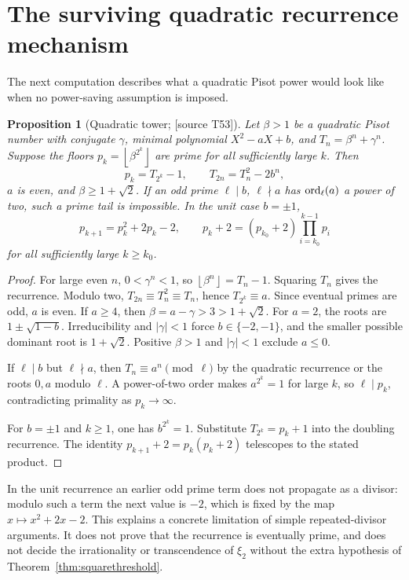 \documentclass[11pt,a4paper]{article}
\newtheorem{proposition}[theorem]{Proposition}
\theoremstyle{definition}\newtheorem{definition}[theorem]{Definition}
\theoremstyle{remark}\newtheorem{remark}[theorem]{Remark}
\newcommand{\floor}[1]{\left\lfloor #1\right\rfloor}\newcommand{\ceil}[1]{\left\lceil #1\right\rceil}
\newcommand{\sourceT}[1]{\textup{[source T#1]}}
\begin{document}
\section{The surviving quadratic recurrence mechanism}
The next computation describes what a quadratic Pisot power would look like when no power-saving assumption is imposed.
\begin{proposition}[Quadratic tower; \sourceT{53}]\label{prop:quadratic}
Let $\beta>1$ be a quadratic Pisot number with conjugate $\gamma$, minimal polynomial $X^2-aX+b$, and $T_n=\beta^n+\gamma^n$. Suppose the floors $p_k=\floor{\beta^{2^k}}$ are prime for all sufficiently large $k$. Then
\[
 p_k=T_{2^k}-1,\qquad T_{2n}=T_n^2-2b^n,
\]
$a$ is even, and $\beta\ge1+\sqrt2$. If an odd prime $\ell\mid b$, $\ell\nmid a$ has $\operatorname{ord}_\ell(a)$ a power of two, such a prime tail is impossible. In the unit case $b=\pm1$,
\[
 p_{k+1}=p_k^2+2p_k-2,\qquad
 p_k+2=(p_{k_0}+2)\prod_{i=k_0}^{k-1}p_i
\]
for all sufficiently large $k\ge k_0$.
\end{proposition}
\begin{proof}
For large even $n$, $0<\gamma^n<1$, so $\floor{\beta^n}=T_n-1$. Squaring $T_n$ gives the recurrence. Modulo two, $T_{2n}\equiv T_n^2\equiv T_n$, hence $T_{2^k}\equiv a$. Since eventual primes are odd, $a$ is even. If $a\ge4$, then $\beta=a-\gamma>3>1+\sqrt2$. For $a=2$, the roots are $1\pm\sqrt{1-b}$. Irreducibility and $|\gamma|<1$ force $b\in\{-2,-1\}$, and the smaller possible dominant root is $1+\sqrt2$. Positive $\beta>1$ and $|\gamma|<1$ exclude $a\le0$.

If $\ell\mid b$ but $\ell\nmid a$, then $T_n\equiv a^n\pmod\ell$ by the quadratic recurrence or the roots $0,a$ modulo $\ell$. A power-of-two order makes $a^{2^k}=1$ for large $k$, so $\ell\mid p_k$, contradicting primality as $p_k\to\infty$.

For $b=\pm1$ and $k\ge1$, one has $b^{2^k}=1$. Substitute $T_{2^k}=p_k+1$ into the doubling recurrence. The identity $p_{k+1}+2=p_k(p_k+2)$ telescopes to the stated product.
\end{proof}
In the unit recurrence an earlier odd prime term does not propagate as a divisor: modulo such a term the next value is $-2$, which is fixed by the map $x\mapsto x^2+2x-2$. This explains a concrete limitation of simple repeated-divisor arguments. It does not prove that the recurrence is eventually prime, and does not decide the irrationality or transcendence of $\xi_2$ without the extra hypothesis of Theorem~\ref{thm:squarethreshold}.
\end{document}
